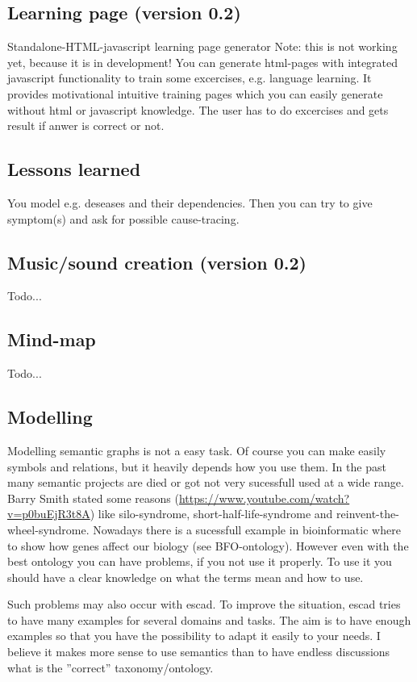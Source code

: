 \documentclass[a4paper, 12pt, openany]{scrbook}
\begin{document}
\subsection{Learning page (version 0.2)}
Standalone-HTML-javascript learning page generator Note: this is not working yet, because it is in development! You can generate html-pages with integrated javascript functionality to train some excercises, e.g. language learning. It provides motivational intuitive training pages which you can easily generate without html or javascript knowledge. The user has to do excercises and gets result if anwer is correct or not.
\subsection{Lessons learned}
You model e.g. deseases and their dependencies. Then you can try to give symptom(s) and ask for possible cause-tracing.
\subsection{Music/sound creation (version 0.2)}
Todo...
\subsection{Mind-map}
Todo...
\subsection{Modelling}
Modelling semantic graphs is not a easy task. Of course you can make easily symbols and relations, but it heavily depends how you use them. In the past many semantic projects are died or got not very sucessfull used at a wide range. Barry Smith stated some reasons (\url{https://www.youtube.com/watch?v=p0buEjR3t8A}) like silo-syndrome, short-half-life-syndrome and reinvent-the-wheel-syndrome. Nowadays there is a sucessfull example in bioinformatic where to show how genes affect our biology (see BFO-ontology). However even with the best ontology you can have problems, if you not use it properly. To use it you should have a clear knowledge on what the terms mean and how to use.

Such problems may also occur with escad. To improve the situation, escad tries to have many examples for several domains and tasks. The aim is to have enough examples so that you have the possibility to adapt it easily to your needs. I believe it makes more sense to use semantics than to have endless discussions what is the ''correct'' taxonomy/ontology.
\end{document}
